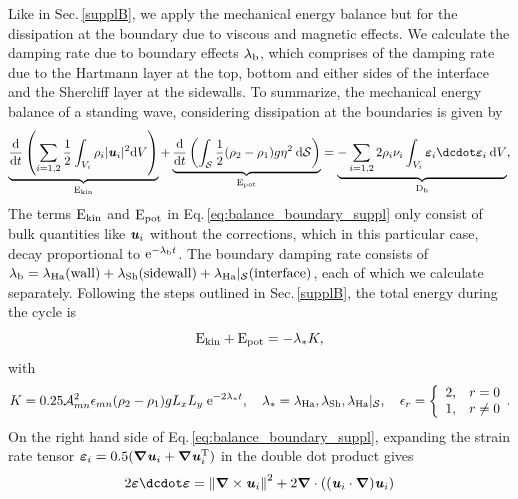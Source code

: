 \documentclass[aps,prfluids,reprint,superscriptaddress]{revtex4-2}
\newcommand{\h}[1]{\textbf{\textit{#1}}}
\newcommand{\ii}[1]{\text{#1}}
\numberwithin{equation}{section}
\begin{document}
Like in Sec.\,\ref{supplB}, we apply the mechanical energy balance but for the dissipation at the boundary due to viscous and magnetic effects. We calculate the damping rate due to boundary effects $\lambda_{\rm b}$, which comprises of the damping rate due to the Hartmann layer at the top, bottom and either sides of the interface and the Shercliff layer at the sidewalls. To summarize, the mechanical energy balance of a standing wave, considering dissipation at the boundaries is given by
\begin{equation}
	\underbrace{
	\dv{}{t}\left( \sum_{i=1,2} \frac{1}{2} 
	\int_{V_i} \rho_i |\h u_i|^2 \mathrm dV  \right)
}_{\ii E_{\rm kin}}
	+
	\underbrace{
	\dv{}{t}\left( \int_{\mathcal{S}} 
	\frac{1}{2} (\rho_2-\rho_1)g\eta^2  \: \mathrm d\mathcal{S}  
	\right)
}_{\ii E_{\rm pot}}
	= 
	\underbrace{
	-\sum_{i=1,2} 2\rho_i\nu_i
	\int_{V_i} \bm\varepsilon_i \bm\dcdot \bm\varepsilon_i  \: \mathrm dV
}_{\ii D_{\rm b}} ,
	\label{eq:balance_boundary_suppl}
\end{equation}
The terms $\ii E_{\rm kin}$ and $\ii E_{\rm pot}$ in Eq.\,\eqref{eq:balance_boundary_suppl} only consist of bulk quantities like $\h u_i$ without the corrections, which in this particular case, decay proportional to $\ii e^{-\lambda_{\rm b} t}$. The boundary damping rate consists of $\lambda_{\rm b} = \lambda_{\rm Ha}(\ii{wall}) + \lambda_{\rm Sh}(\ii{sidewall}) + \lambda_{\rm Ha}|_{\mathcal{S}}(\ii{interface})$, each of which we calculate separately. Following the steps outlined in Sec.\,\ref{supplB}, the total energy during the cycle is
\begin{equation}
	\ii E_{\rm kin} + \ii E_{\rm pot} = -\lambda_* K,
	\label{eq:ekin_epot_k}
\end{equation}
with 
\begin{equation}
	K = 0.25\mathcal{A}^2_{mn}\epsilon_{mn}(\rho_2 - \rho_1)g L_xL_y
	\;\ii e^{-2\lambda_*t} ,
	\quad 
	\lambda_* = \lambda_{\rm Ha}, \lambda_{\rm Sh}, \lambda_{\rm Ha}|_{\mathcal{S}}, \quad
	\epsilon_{r} =
	\biggl\{ \begin{array}{rc}
		2,  & r= 0 \\
		1,  & r\neq 0
	\end{array} .
\end{equation}
On the right hand side of Eq.\,\eqref{eq:balance_boundary_suppl}, expanding the strain rate tensor $\bm\varepsilon_i = 0.5(\bm\nabla\h u_i + \bm\nabla\h u_i^{\rm T})$ in the double dot product gives
\begin{equation}
	2\bm\varepsilon \dcdot \bm\varepsilon = 
	\norm{\bm\nabla \times \h u_i}^2 +
	2\bm\nabla \cdot \left( (\h u_i \cdot \bm\nabla )\h u_i\right)
\end{equation} 
\end{document}
